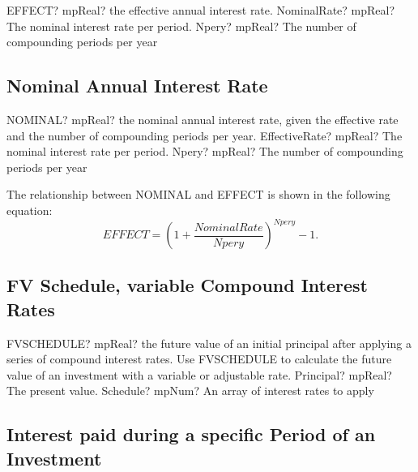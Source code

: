 \begin{mpFunctionsExtract}
	\mpWorksheetFunctionTwoNotImplemented
	{EFFECT? mpReal? the effective annual interest rate.}
	{NominalRate? mpReal? The nominal interest rate per period.}
	{Npery? mpReal? The number of compounding periods per year}
\end{mpFunctionsExtract}




\subsection{Nominal Annual Interest Rate}

\begin{mpFunctionsExtract}
	\mpWorksheetFunctionTwoNotImplemented
	{NOMINAL? mpReal? the nominal annual interest rate, given the effective rate and the number of compounding periods per year.}
	{EffectiveRate? mpReal? The nominal interest rate per period.}
	{Npery? mpReal? The number of compounding periods per year}
\end{mpFunctionsExtract}


\vspace{0.3cm}
The relationship between NOMINAL and EFFECT is shown in the following equation: 
\begin{equation}
	EFFECT = \left(1+ \frac{NominalRate}{Npery}\right)^{Npery}-1.
\end{equation}





\subsection{FV Schedule, variable Compound Interest Rates}

\begin{mpFunctionsExtract}
	\mpWorksheetFunctionTwoNotImplemented
	{FVSCHEDULE? mpReal? the future value of an initial principal after applying a series of compound interest rates. Use FVSCHEDULE to calculate the future value of an investment with a variable or adjustable rate.}
	{Principal? mpReal? The present value.}
	{Schedule? mpNum? An array of interest rates to apply}
\end{mpFunctionsExtract}




\subsection{Interest paid during a specific Period of an Investment}

